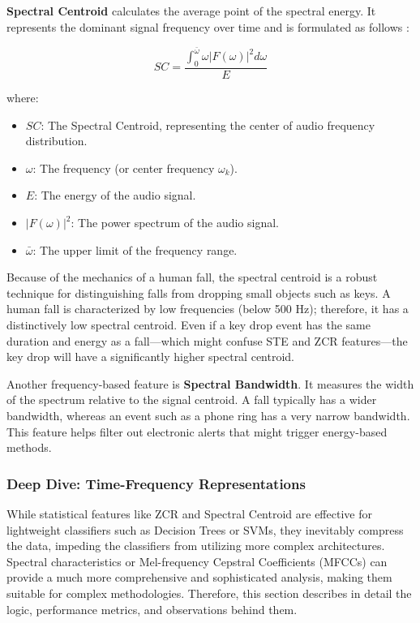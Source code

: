 \documentclass[11pt, a4paper, twoside]{article}
\begin{document}
\textbf{Spectral Centroid} calculates the average point of the spectral energy. It represents the dominant signal frequency over time and is formulated as follows \cite{Babaee2017}:

\begin{equation}
SC = \frac{\int_{0}^{\bar{\omega}} \omega |F(\omega)|^{2} d\omega}{E}
\end{equation}

where:
\begin{itemize}
\item $SC$: The Spectral Centroid, representing the center of audio frequency distribution.
\item $\omega$: The frequency (or center frequency $\omega_k$).
\item $E$: The energy of the audio signal.
\item $|F(\omega)|^{2}$: The power spectrum of the audio signal.
\item $\bar{\omega}$: The upper limit of the frequency range.
\end{itemize}

Because of the mechanics of a human fall, the spectral centroid is a robust technique for distinguishing falls from dropping small objects such as keys. A human fall is characterized by low frequencies (below 500 Hz); therefore, it has a distinctively low spectral centroid. Even if a key drop event has the same duration and energy as a fall—which might confuse STE and ZCR features—the key drop will have a significantly higher spectral centroid.

Another frequency-based feature is \textbf{Spectral Bandwidth}. It measures the width of the spectrum relative to the signal centroid. A fall typically has a wider bandwidth, whereas an event such as a phone ring has a very narrow bandwidth. This feature helps filter out electronic alerts that might trigger energy-based methods.

\subsubsection{Deep Dive: Time-Frequency Representations}
While statistical features like ZCR and Spectral Centroid are effective for lightweight classifiers such as Decision Trees or SVMs, they inevitably compress the data, impeding the classifiers from utilizing more complex architectures. Spectral characteristics or Mel-frequency Cepstral Coefficients (MFCCs) can provide a much more comprehensive and sophisticated analysis, making them suitable for complex methodologies. Therefore, this section describes in detail the logic, performance metrics, and observations behind them.
\end{document}
